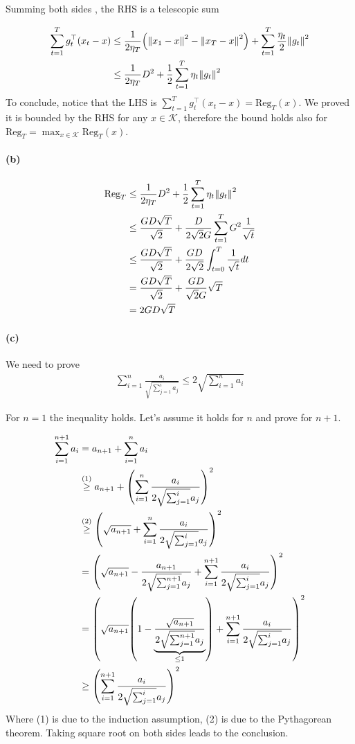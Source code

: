 \documentclass{article}
\DeclarePairedDelimiter\br{(}{)}%
\DeclarePairedDelimiter\norm{\lVert}{\rVert}%
\newcommand{\Kcal}{\mathcal{K}}
\newcommand{\Reg}{\text{Reg}}
\begin{document}
Summing both sides , the RHS is a telescopic sum

\begin{align*}
\sum_{t=1}^T g_t^\top(x_t-x) &\leq \frac{1}{2\eta_T} \br*{\norm*{x_{1}-x}^2 - \norm*{x_T-x}^2 } +\sum_{t=1}^T \frac{\eta_t}{2} \norm*{g_t}^2 \\
& \leq  \frac{1}{2\eta_T} D^2 + \frac{1}{2} \sum_{t=1}^T \eta_t \norm*{g_t}^2
\end{align*}
To conclude, notice that the LHS is $\sum_{t=1}^T g_t^\top(x_t-x) = \Reg_T(x)$. We proved it is bounded by the RHS  for any $x \in \Kcal$, therefore the bound holds also for $\Reg_T = \max_{x \in \Kcal} \Reg_T(x)$.

\paragraph{(b)}

\begin{align*}
\Reg_T &\leq \frac{1}{2\eta_T} D^2 + \frac{1}{2} \sum_{t=1}^T \eta_t \norm*{g_t}^2 \\
& \leq \frac{GD\sqrt{T}}{\sqrt{2}} + \frac{D}{2\sqrt{2}G} \sum_{t=1}^T  G^2 \frac{1}{\sqrt{t}}  \\
& \leq  \frac{GD\sqrt{T}}{\sqrt{2}} + \frac{G D}{2\sqrt{2}} \int_{t=0}^{T} \frac{1}{\sqrt{t}}  dt  \\
& =  \frac{GD\sqrt{T}}{\sqrt{2}} + \frac{G D}{\sqrt{2}G}  \sqrt{T} \\
& = 2 G D  \sqrt{T}
\end{align*}

\paragraph{(c)}
We need to prove
\begin{align*}
\sum_{i=1}^n \frac{a_i}{\sqrt{\sum_{j=1}^{i} a_j}} \leq 2 \sqrt{\sum_{i=1}^n a_i}
\end{align*}

For $n=1$ the inequality holds.
Let's assume it holds for $n$ and prove for $n+1$.


\begin{align*}
\sum_{i=1}^{n+1} a_i 
&= a_{n+1} + \sum_{i=1}^{n} a_i\\
&\stackrel{(1)}{\geq}  a_{n+1} + \br*{\sum_{i=1}^n \frac{a_i}{2\sqrt{\sum_{j=1}^{i}} a_j}}^2\\
&\stackrel{(2)}{\geq} \br*{\sqrt{a_{n+1}} +\sum_{i=1}^n \frac{a_i}{2\sqrt{\sum_{j=1}^{i}} a_j}}^2 \\
&= \br*{\sqrt{a_{n+1}}-  \frac{a_{n+1}}{2\sqrt{\sum_{j=1}^{n+1}} a_j} +\sum_{i=1}^{n+1} \frac{a_i}{2\sqrt{\sum_{j=1}^{i}} a_j}}^2 \\
& =\br*{\sqrt{a_{n+1}} \br*{1 - \underbrace{\frac{\sqrt{a_{n+1}}}{2\sqrt{\sum_{j=1}^{n+1}} a_j} }_{\leq 1}} +\sum_{i=1}^{n+1} \frac{a_i}{2\sqrt{\sum_{j=1}^{i}} a_j}}^2 \\
& \geq \br*{\sum_{i=1}^{n+1} \frac{a_i}{2\sqrt{\sum_{j=1}^{i}} a_j}}^2
\end{align*}
Where (1) is due to the induction assumption, (2) is due to the Pythagorean theorem.
Taking square root on both sides leads to the conclusion.
\end{document}
